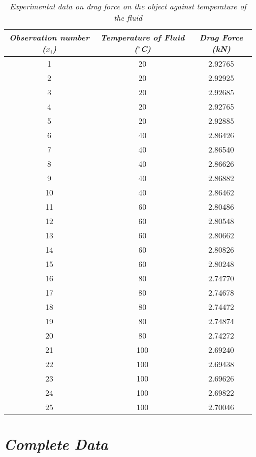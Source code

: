 	\begin{table}[H]
		\centering
		\begin{tabular}{|c|c|c|}
			\hline
			\hline
			\textit{Observation number ($x_i$)} & \textit{Temperature of Fluid ($^\circ$C)} & \textit{Drag Force (kN)} \\
			\hline
			\hline
			1 & 20 & 2.92765 \\
			\hline
			2 & 20 & 2.92925 \\
			\hline
			3 & 20 & 2.92685 \\
			\hline
			4 & 20 & 2.92765 \\
			\hline
			5 & 20 & 2.92885 \\
			\hline
			6 & 40 & 2.86426 \\
			\hline
			7 & 40 & 2.86540 \\
			\hline
			8 & 40 & 2.86626 \\
			\hline
			9 & 40 & 2.86882 \\
			\hline
			10 & 40 & 2.86462 \\
			\hline
			11 & 60 & 2.80486 \\
			\hline
			12 & 60 & 2.80548 \\
			\hline
			13 & 60 & 2.80662 \\
			\hline
			14 & 60 & 2.80826 \\
			\hline
			15 & 60 & 2.80248 \\
			\hline
			16 & 80 & 2.74770 \\
			\hline
			17 & 80 & 2.74678 \\
			\hline
			18 & 80 & 2.74472 \\
			\hline
			19 & 80 & 2.74874 \\
			\hline
			20 & 80 & 2.74272 \\
			\hline
			21 & 100 & 2.69240 \\
			\hline
			22 & 100 & 2.69438 \\
			\hline
			23 & 100 & 2.69626 \\
			\hline
			24 & 100 & 2.69822 \\
			\hline
			25 & 100 & 2.70046 \\
			\hline
			\hline
		\end{tabular}
		\caption{\textit{Experimental data on drag force on the object against temperature of the fluid}}
		\label{expdat}
	\end{table}

\section{\textit{Complete Data}}

